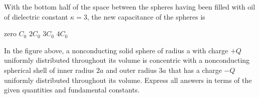 \documentclass{../../../oss-classkick-exam}
\begin{document}
\begin{multicols*}{2}
\begin{questions}
    \question With the bottom half of the space between the spheres having been
    filled with oil of dielectric constant $\kappa=3$, the new capacitance of
    the spheres is
    \label{cap2}
    \begin{choices}
      \choice zero
      \choice $C_0$
      \choice $2C_0$
      \choice $3C_0$
      \choice $4C_0$
    \end{choices}   
  \end{questions}
\end{multicols*}
\newpage


\genfreedirections

\begin{questions}
  \question In the figure above, a nonconducting solid sphere of radius a with
  charge $+Q$ uniformly distributed throughout its volume is concentric with a
  nonconducting spherical shell of inner radius $2a$ and outer radius $3a$ that
  has a charge $-Q$ uniformly distributed throughout its volume. Express all
  answers in terms of the given quantities and fundamental constants.

  \newpage


\end{questions}
\end{document}

